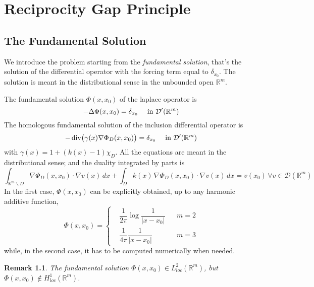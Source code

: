 \documentclass[10pt, a4paper, twoside, openright]{book}
\theoremstyle{definition}
\theoremstyle{plain}
\theoremstyle{plain}
\theoremstyle{plain}
\theoremstyle{plain}
\newtheorem{remark}[subsection]{Remark}
\theoremstyle{plain}
\theoremstyle{plain}
\theoremstyle{plain}
\theoremstyle{plain}
\DeclareMathOperator{\divergence}{div}
\begin{document}
\chapter{Reciprocity Gap Principle}
\label{ch:reciprocity}
\section{The Fundamental Solution}
\label{subsection:fundamental-solution}
We introduce the problem starting from the \emph{fundamental solution}, that's the solution of the differential operator with the forcing term equal to $\delta_{x_0}$.
The solution is meant in the distributional sense in the unbounded open $\mathbb{R}^m$. 
\par
The fundamental solution $\Phi(x,x_0)$ of the laplace operator is
\begin{equation}
 - \Delta \Phi(x,x_0) = \delta_{x_0} \quad \textup{ in }\mathcal{D}'(\mathbb{R}^m)\label{eq:fundamental-in-dist}
\end{equation}
The homologous fundamental solution of the inclusion differential operator is
\begin{equation}
 - \divergence\bigl(\gamma(x)\nabla \Phi_D(x,x_0)\bigr) = \delta_{x_0}\quad\textup{ in }\mathcal{D}'(\mathbb{R}^m)\label{eq:fundamental-D-in-dist}
\end{equation}
with $\gamma(x) = 1+(k(x)-1)\chi_D$. 
All the equations are meant in the distributional sense; and the duality integrated by parts is
\begin{equation}
 \int_{\mathbb{R}^m \backslash D}\nabla \Phi_D(x,x_0) \cdot \nabla v(x) \, dx + \int_{D} k(x) \, \nabla \Phi_D(x,x_0) \cdot \nabla v(x) \, dx = v(x_0) \, \forall v \in \mathcal{D}(\mathbb{R}^m)
\end{equation}
In the first case, $\Phi(x,x_0)$ can be explicitly obtained, up to any harmonic additive function,
\begin{equation}
\label{eq:definition-Phi-23}
  \Phi(x,x_0)=
  \left\{
  \begin{aligned}
   &\dfrac{1}{2\pi}\log\dfrac{1}{| x - x_0|} && m=2 \\
   &\dfrac{1}{4\pi}\dfrac{1}{| x  - x_0|} && m=3 
  \end{aligned}
  \right.
\end{equation}
while, in the second case, it has to be computed numerically when needed.
\par
\begin{remark}
 The fundamental solution $\Phi(x,x_0)\in L^2_{loc}(\mathbb{R}^m)$, but $\Phi(x,x_0)\notin H^1_{loc}(\mathbb{R}^m)$.
\end{remark}
\end{document}
